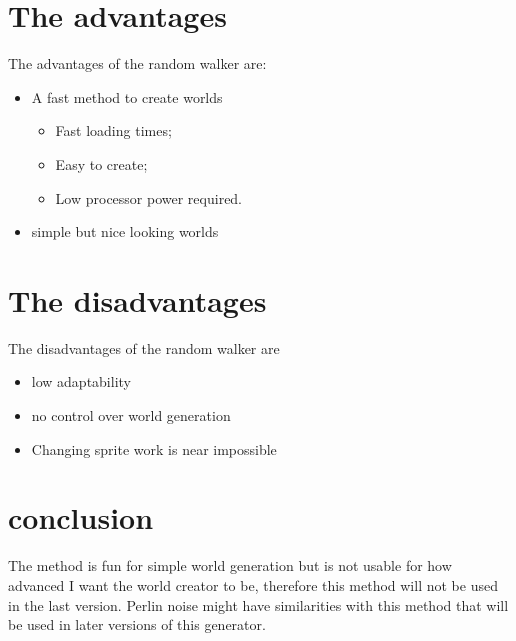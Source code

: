 \documentclass[8pt,letterpaper]{article}
\begin{document}
\section{The advantages}
The advantages of the random walker are:
\begin{itemize}
    \item A fast method to create worlds
        \begin{itemize}
        \item Fast loading times;
        \item Easy to create;
        \item Low processor power required.
        \end{itemize}
    \item simple but nice looking worlds
\end{itemize}
\section{The disadvantages}
The disadvantages of the random walker are
\begin{itemize}
    \item low adaptability
    \item no control over world generation
    \item Changing sprite work is near impossible
\end{itemize}

\section{conclusion}
The method is fun for simple world generation but is not usable for how advanced I want the world creator to be, therefore this method will not be used in the last version. Perlin noise might have similarities with this method that will be used in later versions of this generator.
\end{document}
